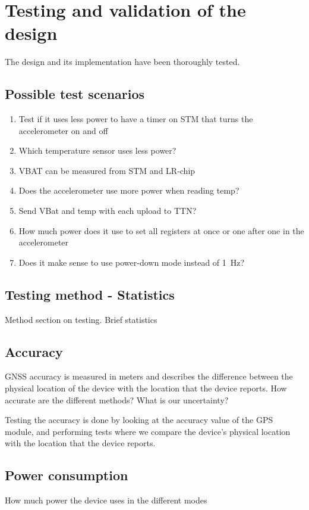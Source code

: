 \section{Testing and validation of the design } \label{sec:testing}

The design and its implementation have been thoroughly tested.

\subsection{Possible test scenarios}
\begin{enumerate}
    \item Test if it uses less power to have a timer on STM that turns the accelerometer on and off
    \item Which temperature sensor uses less power?
    \item VBAT can be measured from STM and LR-chip
    \item Does the accelerometer use more power when reading temp?
    \item Send VBat and temp with each upload to TTN?
    \item How much power does it use to set all registers at once or one after one in the accelerometer
    \item Does it make sense to use power-down mode instead of \SI{1}{\hertz}?
\end{enumerate}

\subsection{Testing method - Statistics}
Method section on testing. Brief statistics

\subsection{Accuracy}
\ac{GNSS} accuracy is measured in meters and describes the difference between the physical location of the device with the location that the device reports.
How accurate are the different methods? What is our uncertainty?

Testing the accuracy is done by looking at the accuracy value of the GPS module, and performing tests where we compare the device's physical location with the location that the device reports.

\subsection{Power consumption}
How much power the device uses in the different modes

